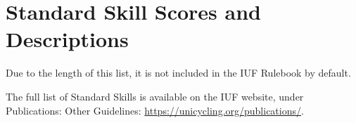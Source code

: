 \section{Standard Skill Scores and Descriptions}

Due to the length of this list, it is not included in the IUF Rulebook by default.

The full list of Standard Skills is available on the IUF website, under Publications: Other Guidelines: \url{https://unicycling.org/publications/}.

